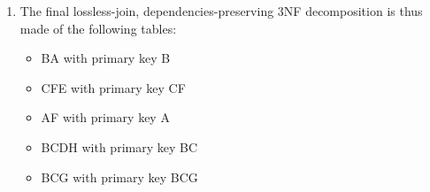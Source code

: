 \documentclass[9pt]{article}
\begin{document}
\begin{enumerate}
\begin{enumerate}
\begin{enumerate}
\begin{enumerate}
            \end{enumerate}
        \end{enumerate}
        \item The final lossless-join, dependencies-preserving 3NF decomposition is thus made of the following tables:
        \begin{itemize}
            \item BA with primary key B
            \item CFE with primary key CF
            \item AF with primary key A
            \item BCDH with primary key BC
            \item BCG with primary key BCG
        \end{itemize}
    \end{enumerate}
   

\end{enumerate}
\end{document}
